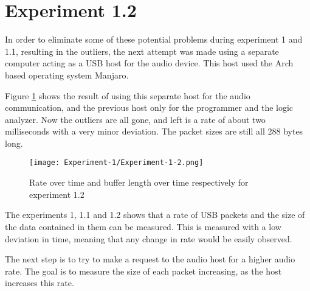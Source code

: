 \section{Experiment 1.2}

In order to eliminate some of these potential problems during
experiment 1 and 1.1, resulting in the outliers, the next attempt was
made using a separate computer acting as a USB host for the audio
device. This host used the Arch based operating system Manjaro.

Figure \ref{fig:experiment-1-2} shows the result of using this
separate host for the audio communication, and the previous host only
for the programmer and the logic analyzer. Now the outliers are all
gone, and left is a rate of about two milliseconds with a very minor
deviation. The packet sizes are still all 288 bytes long.

\begin{figure}[h]
	\caption{Rate over time and buffer length over time respectively
	for experiment 1.2}
	\centering
	\texttt{[image: Experiment-1/Experiment-1-2.png]}
	\label{fig:experiment-1-2}
\end{figure}

The experiments 1, 1.1 and 1.2 shows that a rate of USB packets and
the size of the data contained in them can be measured. This is
measured with a low deviation in time, meaning that any change in rate
would be easily observed.

The next step is to try to make a request to the audio host for a
higher audio rate. The goal is to measure the size of each packet
increasing, as the host increases this rate.
